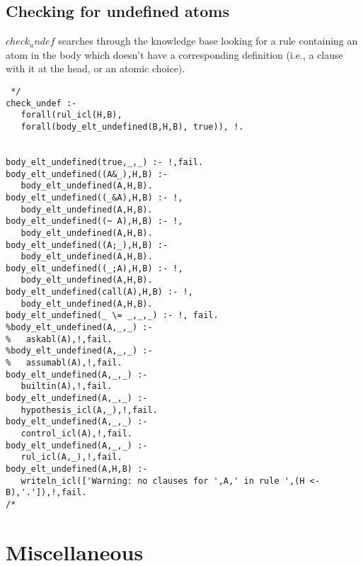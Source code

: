 \documentclass[11pt,fleqn]{article}
\begin{document}
\subsection{Checking for undefined atoms}
$check_undef$ searches through the knowledge base looking for a rule
containing an atom in the body which doesn't have a corresponding
definition (i.e., a clause with it at the head, or an atomic choice).
\begin{verbatim} */
check_undef :-
   forall(rul_icl(H,B),
   forall(body_elt_undefined(B,H,B), true)), !.


body_elt_undefined(true,_,_) :- !,fail.
body_elt_undefined((A&_),H,B) :-
   body_elt_undefined(A,H,B).
body_elt_undefined((_&A),H,B) :- !,
   body_elt_undefined(A,H,B).
body_elt_undefined((~ A),H,B) :- !,
   body_elt_undefined(A,H,B).
body_elt_undefined((A;_),H,B) :-
   body_elt_undefined(A,H,B).
body_elt_undefined((_;A),H,B) :- !,
   body_elt_undefined(A,H,B).
body_elt_undefined(call(A),H,B) :- !,
   body_elt_undefined(A,H,B).
body_elt_undefined(_ \= _,_,_) :- !, fail.
%body_elt_undefined(A,_,_) :-
%   askabl(A),!,fail.
%body_elt_undefined(A,_,_) :-
%   assumabl(A),!,fail.
body_elt_undefined(A,_,_) :-
   builtin(A),!,fail.
body_elt_undefined(A,_,_) :-
   hypothesis_icl(A,_),!,fail.
body_elt_undefined(A,_,_) :-
   control_icl(A),!,fail.
body_elt_undefined(A,_,_) :-
   rul_icl(A,_),!,fail.
body_elt_undefined(A,H,B) :-
   writeln_icl(['Warning: no clauses for ',A,' in rule ',(H <- B),'.']),!,fail.
/* \end{verbatim}

\section{Miscellaneous}
\end{document}
